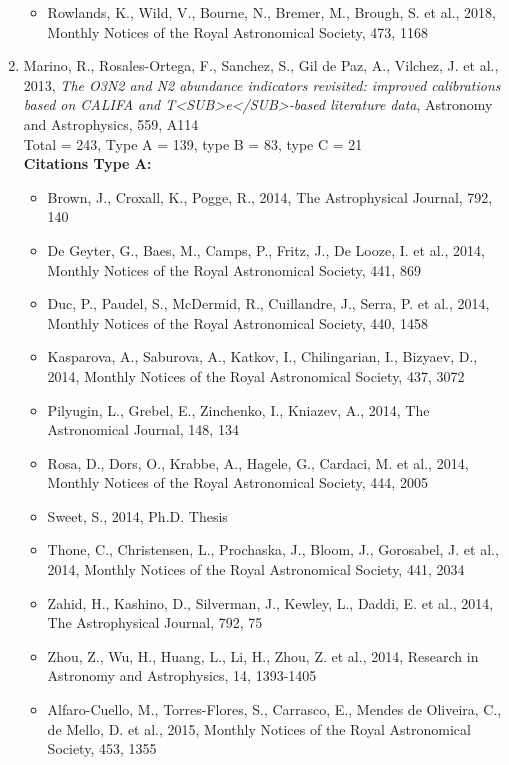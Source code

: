 \documentclass{letter}
\begin{document}
\begin{enumerate}
\begin{itemize}
\item Rowlands, K., Wild, V., Bourne, N., Bremer, M., Brough, S. et al., 2018, Monthly Notices of the Royal Astronomical Society, 473, 1168
\end{itemize}
\item Marino, R., Rosales-Ortega, F., Sanchez, S., Gil de Paz, A., Vilchez, J. et al., 2013, {\it The O3N2 and N2 abundance indicators revisited: improved calibrations based on CALIFA and T<SUB>e</SUB>-based literature data}, Astronomy and Astrophysics, 559, A114 \\ 
Total = 243, Type A = 139, type B = 83, type C = 21 \\ 
{\bf Citations Type A:}
\begin{itemize}
\item Brown, J., Croxall, K., Pogge, R., 2014, The Astrophysical Journal, 792, 140
\item De Geyter, G., Baes, M., Camps, P., Fritz, J., De Looze, I. et al., 2014, Monthly Notices of the Royal Astronomical Society, 441, 869
\item Duc, P., Paudel, S., McDermid, R., Cuillandre, J., Serra, P. et al., 2014, Monthly Notices of the Royal Astronomical Society, 440, 1458
\item Kasparova, A., Saburova, A., Katkov, I., Chilingarian, I., Bizyaev, D., 2014, Monthly Notices of the Royal Astronomical Society, 437, 3072
\item Pilyugin, L., Grebel, E., Zinchenko, I., Kniazev, A., 2014, The Astronomical Journal, 148, 134
\item Rosa, D., Dors, O., Krabbe, A., Hagele, G., Cardaci, M. et al., 2014, Monthly Notices of the Royal Astronomical Society, 444, 2005
\item Sweet, S., 2014, Ph.D. Thesis
\item Thone, C., Christensen, L., Prochaska, J., Bloom, J., Gorosabel, J. et al., 2014, Monthly Notices of the Royal Astronomical Society, 441, 2034
\item Zahid, H., Kashino, D., Silverman, J., Kewley, L., Daddi, E. et al., 2014, The Astrophysical Journal, 792, 75
\item Zhou, Z., Wu, H., Huang, L., Li, H., Zhou, Z. et al., 2014, Research in Astronomy and Astrophysics, 14, 1393-1405
\item Alfaro-Cuello, M., Torres-Flores, S., Carrasco, E., Mendes de Oliveira, C., de Mello, D. et al., 2015, Monthly Notices of the Royal Astronomical Society, 453, 1355

\end{itemize}
\end{enumerate}
\end{document}
